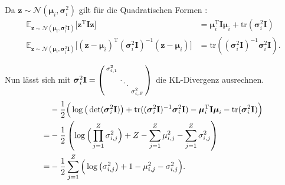 \documentclass[12pt]{article}
\newcommand{\z}{\mathbf{z}}
\begin{document}
	Da $\z\sim\mathcal{N}(\boldsymbol\mu_{i},\boldsymbol\sigma_{i}^{2})$ gilt für die Quadratischen Formen \cite{matrix}:
	\begin{align*}
	\mathbb{E}_{\z\sim\mathcal{N}(\boldsymbol\mu_{i},\boldsymbol\sigma_{i}^{2}\mathbf{I})}\big[\textbf{z}^{\mathrm{T}}\mathbf{I}\textbf{z}\big] &= \boldsymbol\mu_{i}^{\mathrm{T}}\mathbf{I}\boldsymbol\mu_{i}+\mathrm{tr}(\boldsymbol\sigma_{i}^{2}\mathbf{I})\\ \mathbb{E}_{\z\sim\mathcal{N}(\boldsymbol\mu_{i},\boldsymbol\sigma_{i}^{2}\mathbf{I})}\big[(\textbf{z}-\boldsymbol\mu_{i})^{\mathrm{T}}(\boldsymbol\sigma_{i}^{2}\mathbf{I})^{-1}(\textbf{z}-\boldsymbol\mu_{i})\big] &= \mathrm{tr}((\boldsymbol\sigma_{i}^{2}\mathbf{I})^{-1}\boldsymbol\sigma_{i}^{2}\mathbf{I}).
	\end{align*}
	
	
	Nun lässt sich mit ${\boldsymbol\sigma_{i}^{2}\mathbf{I}} =  \begin{psmallmatrix}\sigma_{i,1}^{2} & \ &\ \\ \ & \ddots &\ \\ \ & \ &\sigma_{i,Z}^{2}\end{psmallmatrix}$ die KL-Divergenz ausrechnen.
	\begin{align*}
	&-\frac{1}{2}\Big(\log\big(\det(\boldsymbol\sigma_{i}^{2}\mathbf{I})\big)+\mathrm{tr}((\boldsymbol\sigma_{i}^{2}\mathbf{I})^{-1}\boldsymbol\sigma_{i}^{2}\mathbf{I})-\boldsymbol\mu_{i}^{\mathrm{T}}\textbf{I}\boldsymbol\mu_{i}-\mathrm{tr}(\boldsymbol\sigma_{i}^{2}\mathbf{I})\Big) \notag \\
	= &-\frac{1}{2}\left(\log\Big(\prod_{j=1}^{Z}\sigma_{i,j}^{2}\Big)+Z-\sum_{j=1}^{Z}\mu_{i,j}^{2}-\sum_{j=1}^{Z}\sigma_{i,j}^{2}\right) \notag \\
	= &-\frac{1}{2}\sum_{j=1}^{Z}\Big(\log\big(\sigma_{i,j}^{2}\big)+1-\mu_{i,j}^{2}-\sigma_{i,j}^{2}\Big).
	\end{align*}
	
\end{document}
